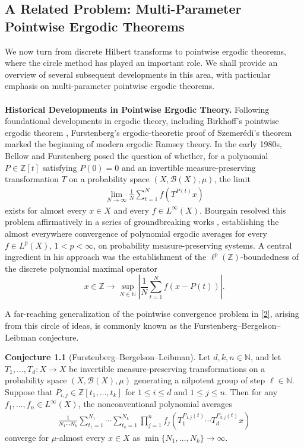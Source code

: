 \documentclass[10pt,a4paper]{amsart}
\numberwithin{equation}{section}
\begin{document}
\subsection{A Related Problem: Multi-Parameter Pointwise Ergodic Theorems}We now  turn from discrete Hilbert transforms to pointwise ergodic theorems, where the circle method has played an important role.
We shall provide an overview of several subsequent developments in this area, with particular emphasis on multi-parameter pointwise ergodic theorems.\\\\
\noindent \textbf{Historical Developments in Pointwise Ergodic Theory.}  
Following foundational developments in ergodic theory, including Birkhoff's pointwise ergodic theorem \cite{Bi}, Furstenberg's ergodic-theoretic proof of Szemerédi's theorem \cite{F0,Sz} marked the beginning of modern ergodic Ramsey theory.
 In the early 1980s, Bellow \cite{Bel} and Furstenberg \cite{F1} posed the question of whether, for a polynomial $P \in \mathbb{Z}[t]$ satisfying $P(0)=0$ and an invertible measure-preserving transformation $T$ on a probability space $(X,\mathcal{B}(X),\mu)$, the limit \begin{align}\label{2}
	\lim_{N \to \infty}\frac{1}{N}\sum_{t=1}^{N} f(T^{P(t)}x)
\end{align}
exists for almost every $x \in X$ and every $f \in L^\infty(X)$.   
Bourgain resolved this problem affirmatively in a series of groundbreaking works \cite{B1,B2,B3}, establishing the almost everywhere convergence of polynomial ergodic averages for every $f\in L^p(X)$, $1<p<\infty$, on probability measure-preserving systems. A central ingredient in his approach was the establishment of the $\ell^p(\mathbb{Z})$-boundedness of the discrete polynomial maximal operator
$$x\in\mathbb{Z}\rightarrow\sup_{N\in \mathbb{N}}\left|\frac{1}{N}\sum_{t=1}^{N} f(x-P(t))\right|.$$

 A far-reaching generalization of the
pointwise convergence problem in \eqref{2}, arising from this circle of
ideas, is commonly known as the Furstenberg--Bergelson--Leibman conjecture.

\medskip
\noindent
\textbf{Conjecture 1.1} (Furstenberg--Bergelson--Leibman).  
Let $d,k,n \in \mathbb{N}$, and let $T_1,\dots,T_d : X \to X$ be invertible measure-preserving transformations on a probability space $(X,\mathcal{B}(X),\mu)$ generating a nilpotent group of step $\ell \in \mathbb{N}$. Suppose that
$P_{i,j} \in \mathbb{Z}[t_1,\dots,t_k]$ for $ 1 \le i \le d$ and  $1 \le j \le n.$
Then for any $f_1,\dots,f_n \in L^\infty(X)$, the nonconventional polynomial averages
\begin{align}\label{o1}
	\frac{1}{N_1\cdots N_k}
	\sum_{t_1=1}^{N_1}\cdots\sum_{t_k=1}^{N_k}
	\prod_{j=1}^n
	f_j\left(
	T_1^{P_{1,j}(t)} \cdots T_d^{P_{d,j}(t)} x
	\right)
\end{align}
converge for $\mu$-almost every $x \in X$ as $\min\{N_1,\dots,N_k\}\to\infty$.
\end{document}

